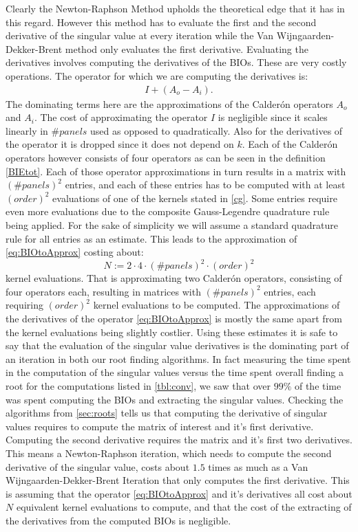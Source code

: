 \documentclass[a4paper, oneside]{discothesis}
\begin{document}
Clearly the Newton-Raphson Method upholds the theoretical edge that it has in this regard.
However this method has to evaluate the first and the second derivative of the singular value at every iteration while the Van Wijngaarden-Dekker-Brent method only evaluates the first derivative.
Evaluating the derivatives involves computing the derivatives of the BIOs.
These are very costly operations.
The operator for which we are computing the derivatives is:
\begin{align}
	I + (A_o-A_i) \label{eq:BIOtoApprox}.
\end{align}
The dominating terms here are the approximations of the Calderón operators $A_o$ and $A_i$.
The cost of approximating the operator $I$ is negligible since it scales linearly in $\#panels$ used as opposed to quadratically.
Also for the derivatives of the operator it is dropped since it does not depend on $k$.
Each of the Calderón operators however consists of four operators as can be seen in the definition \ref{BIEtot}.
Each of those operator approximations in turn results in a matrix with $(\#panels)^2$ entries, and each of these entries has to be computed with at least $(order)^2$ evaluations of one of the kernels stated in \ref{cg}.
Some entries require even more evaluations due to the composite Gauss-Legendre quadrature rule being applied.
For the sake of simplicity we will assume a standard quadrature rule for all entries as an estimate.
This leads to the approximation of \ref{eq:BIOtoApprox} costing about:
\begin{equation}
	N := 2\cdot4\cdot(\#panels)^2\cdot(order)^2
\end{equation}
kernel evaluations.
That is approximating two Calderón operators, consisting of four operators each, resulting in matrices with $(\#panels)^2$ entries, each requiring $(order)^2$ kernel evaluations to be computed. 
The approximations of the derivatives of the operator \ref{eq:BIOtoApprox} is mostly the same apart from the kernel evaluations being slightly costlier.
Using these estimates it is safe to say that the evaluation of the singular value derivatives is the dominating part of an iteration in both our root finding algorithms.
In fact measuring the time spent in the computation of the singular values versus the time spent overall finding a root for the computations listed in \ref{tbl:conv}, we saw that over $99\%$ of the time was spent computing the BIOs and extracting the singular values.
Checking the algorithms from \ref{sec:roots} tells us that computing the derivative of singular values requires to compute the matrix of interest and it's first derivative.
Computing the second derivative requires the matrix and it's first two derivatives.
This means a Newton-Raphson iteration, which needs to compute the second derivative of the singular value, costs about $1.5$ times as much as a Van Wijngaarden-Dekker-Brent Iteration that only computes the first derivative.
This is assuming that the operator \ref{eq:BIOtoApprox} and it's derivatives all cost about $N$ equivalent kernel evaluations to compute, and that the cost of the extracting of the derivatives from the computed BIOs is negligible.
\end{document}
